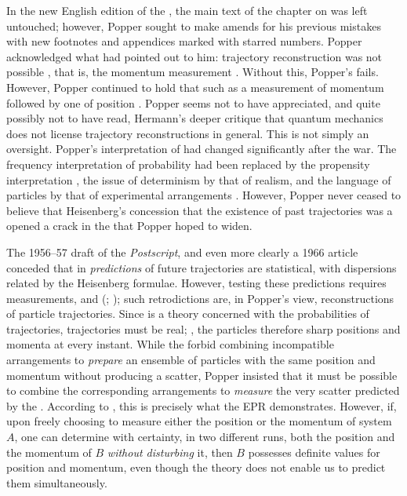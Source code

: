 In the new English edition of the \Lo, the main text of the chapter on \qm was left untouched; however, Popper sought to make amends for his previous mistakes with new footnotes and appendices marked with starred numbers. Popper acknowledged what \vW had pointed out to him: trajectory reconstruction was not possible , that is, the momentum measurement \citep[242\me]{Popper1959}. Without this, Popper's \TE fails. However, Popper continued to hold that  such as a measurement of momentum followed by one of position \citep[242\me]{Popper1959}. Popper seems not to have appreciated, and quite possibly not to have read, Hermann's deeper critique that quantum mechanics does not license trajectory reconstructions in general. This is not simply an oversight. Popper’s interpretation of \qm had changed significantly after the war. The frequency interpretation of probability had been replaced by the propensity interpretation \citep{Popper1957,Popper1959}, the issue of determinism by that of realism, and the language of particles by that of experimental arrangements \citep{Howard2012}. However, Popper never ceased to believe that Heisenberg’s concession that the existence of past trajectories was a  opened a crack in the  that Popper hoped to widen.

The 1956--57 draft of the \emph{Postscript}, and even more clearly a 1966 article \citep{Popper1967} conceded that in \qm \emph{predictions} of future trajectories are statistical, with dispersions related by the Heisenberg formulae. However, testing these predictions requires measurements, and  (\cite[25]{Popper1967}; \cite[60]{Popper1982}); such retrodictions are, in Popper's view, reconstructions of particle trajectories. Since \qm is a theory concerned with the probabilities of trajectories, trajectories must be real; \ie, the particles therefore  sharp positions and momenta at every instant. While the \UR forbid combining incompatible arrangements to \emph{prepare} an ensemble of particles with the same position and momentum without producing a scatter, Popper insisted that it must be possible to combine the corresponding arrangements to \emph{measure} the very scatter predicted by the \UR \citep[21]{Popper1967}. According to \citet[III-17]{Popper1982}, this is precisely what the EPR \TE demonstrates. However, if, upon freely choosing to measure either the position or the momentum of system $A$, one can determine with certainty, in two different runs, both the position and the momentum of $B$ \emph{without disturbing} it, then $B$ possesses definite values for position and momentum, even though the theory does not enable us to predict them simultaneously.

